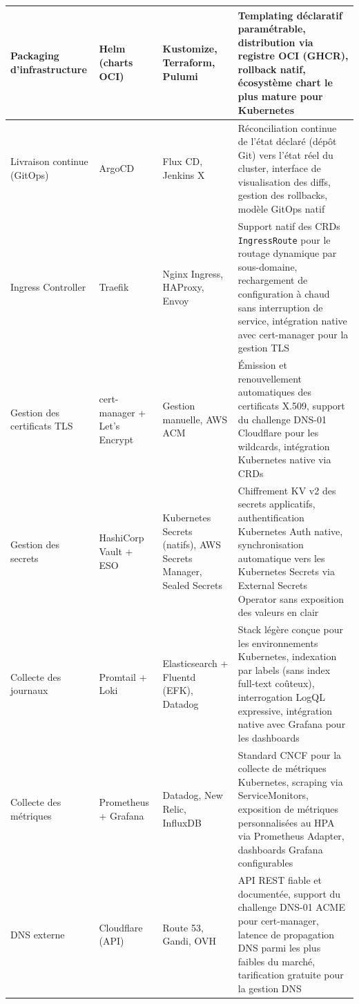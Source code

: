 \begin{longtable}{|p{2.8cm}|p{2.5cm}|p{2.5cm}|p{5.2cm}|}
\hline
Packaging d'infrastructure
  & Helm (charts OCI)
  & Kustomize, Terraform, Pulumi
  & Templating déclaratif paramétrable, distribution via registre OCI (GHCR), rollback natif, écosystème chart le plus mature pour Kubernetes \cite{helm-docs} \\
\hline
Livraison continue (GitOps)
  & ArgoCD
  & Flux CD, Jenkins X
  & Réconciliation continue de l'état déclaré (dépôt Git) vers l'état réel du cluster, interface de visualisation des diffs, gestion des rollbacks, modèle GitOps natif \cite{gitops-principles} \\
\hline
Ingress Controller
  & Traefik
  & Nginx Ingress, HAProxy, Envoy
  & Support natif des CRDs \texttt{IngressRoute} pour le routage dynamique par sous-domaine, rechargement de configuration à chaud sans interruption de service, intégration native avec cert-manager pour la gestion TLS \cite{cert-manager-docs} \\
\hline
Gestion des certificats TLS
  & cert-manager + Let's Encrypt
  & Gestion manuelle, AWS ACM
  & Émission et renouvellement automatiques des certificats X.509, support du challenge DNS-01 Cloudflare pour les wildcards, intégration Kubernetes native via CRDs \cite{cert-manager-acme} \\
\hline
Gestion des secrets
  & HashiCorp Vault + ESO
  & Kubernetes Secrets (natifs), AWS Secrets Manager, Sealed Secrets
  & Chiffrement KV v2 des secrets applicatifs, authentification Kubernetes Auth native, synchronisation automatique vers les Kubernetes Secrets via External Secrets Operator sans exposition des valeurs en clair \cite{loki-http-api} \\
\hline
Collecte des journaux
  & Promtail + Loki
  & Elasticsearch + Fluentd (EFK), Datadog
  & Stack légère conçue pour les environnements Kubernetes, indexation par labels (sans index full-text coûteux), interrogation LogQL expressive, intégration native avec Grafana pour les dashboards \cite{promtail-scraping} \\
\hline
Collecte des métriques
  & Prometheus + Grafana
  & Datadog, New Relic, InfluxDB
  & Standard CNCF pour la collecte de métriques Kubernetes, scraping via ServiceMonitors, exposition de métriques personnalisées au HPA via Prometheus Adapter, dashboards Grafana configurables \cite{prometheus-operator} \\
\hline
DNS externe
  & Cloudflare (API)
  & Route 53, Gandi, OVH
  & API REST fiable et documentée, support du challenge DNS-01 ACME pour cert-manager, latence de propagation DNS parmi les plus faibles du marché, tarification gratuite pour la gestion DNS \cite{cert-manager-cloudflare} \\

\end{longtable}
